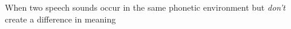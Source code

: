 When two speech sounds occur in the same phonetic environment but \emph{don't} create a difference in meaning
